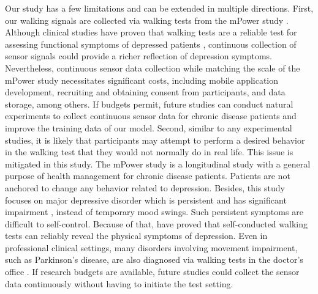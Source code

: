 \documentclass[mnsc]{informs3b} %
\begin{document}
Our study has a few limitations and can be extended in multiple directions. First, our walking signals are collected via walking tests from the mPower study \citep{bot_mpower_2016}. Although clinical studies have proven that walking tests are a reliable test for assessing functional symptoms of depressed patients \citep{vancampfort_testretest_2020}, continuous collection of sensor signals could provide a richer reflection of depression symptoms. Nevertheless, continuous sensor data collection while matching the scale of the mPower study necessitates significant costs, including mobile application development, recruiting and obtaining consent from participants, and data storage, among others. If budgets permit, future studies can conduct natural experiments to collect continuous sensor data for chronic disease patients and improve the training data of our model. Second, similar to any experimental studies, it is likely that participants may attempt to perform a desired behavior in the walking test that they would not normally do in real life. This issue is mitigated in this study. The mPower study is a longitudinal study with a general purpose of health management for chronic disease patients. Patients are not anchored to change any behavior related to depression. Besides, this study focuses on major depressive disorder which is persistent and has significant impairment \citep{mayo_clinic_depression_2022}, instead of temporary mood swings. Such persistent symptoms are difficult to self-control. Because of that, \cite{vancampfort_testretest_2020} have proved that self-conducted walking tests can reliably reveal the physical symptoms of depression. Even in professional clinical settings, many disorders involving movement impairment, such as Parkinson's disease, are also diagnosed via walking tests in the doctor's office \citep{yu_wearable_2022}. If research budgets are available, future studies could collect the sensor data continuously without having to initiate the test setting.


\clearpage

\renewcommand{\theequation}{\arabic{equation}} 
\renewcommand{\thetable}{\arabic{table}}

\ECSwitch

\end{document}
